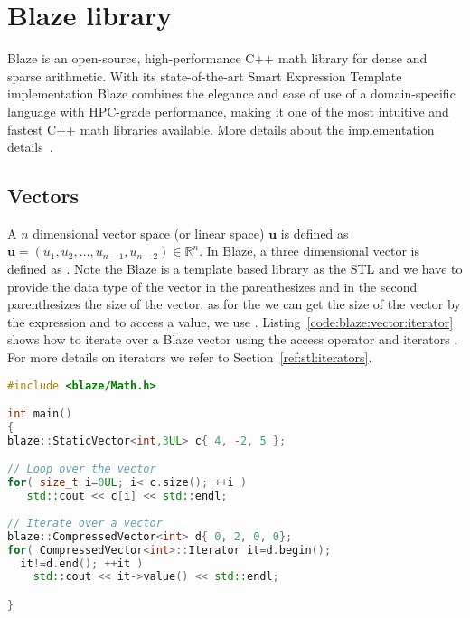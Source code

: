\documentclass[11pt,fleqn]{book} %
\begin{document}
\section{Blaze library}
Blaze is an open-source, high-performance C++ math library for dense and sparse arithmetic. With its state-of-the-art Smart Expression Template implementation Blaze combines the elegance and ease of use of a domain-specific language with HPC-grade performance, making it one of the most intuitive and fastest C++ math libraries available. More details about the implementation details~\cite{doi:10.1137/110830125,6266939}.

\subsection{Vectors}
A $n$ dimensional vector space (or linear space) $\mathbf{u}$ is defined as $\mathbf{u}=(u_1,u_2,\ldots,u_{n-1},u_{n-2})\in \mathbb{R}^n$. In Blaze, a three dimensional vector is defined as . Note the Blaze is a template based library as the STL and we have to provide the data type of the vector in the parenthesizes  and in the second parenthesizes  the size of the vector. as for the  we can get the size of the vector by the expression  and to access a value, we use . Listing~\ref{code:blaze:vector:iterator} shows how to iterate over a Blaze vector using the access operator  and iterators . For more details on iterators we refer to Section~\ref{ref:stl:iterators}. \\

\begin{lstlisting}[language=c++,caption={Iterating over a Blaze vector using a for loop with iterators.\label{code:blaze:vector:iterator}},float,floatplacement=tb]
#include <blaze/Math.h>

int main()
{
blaze::StaticVector<int,3UL> c{ 4, -2, 5 };

// Loop over the vector
for( size_t i=0UL; i< c.size(); ++i )
   std::cout << c[i] << std::endl;
   
// Iterate over a vector
blaze::CompressedVector<int> d{ 0, 2, 0, 0};
for( CompressedVector<int>::Iterator it=d.begin(); 
  it!=d.end(); ++it ) 
    std::cout << it->value() << std::endl;

}
\end{lstlisting}
\end{document}
